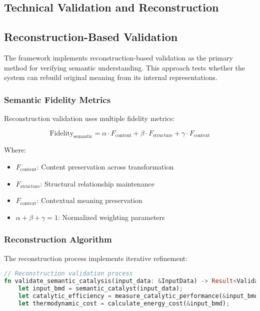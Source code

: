 \documentclass[12pt,a4paper,twoside]{article}
\begin{document}
\begin{itemize}
\section{Technical Validation and Reconstruction}

\subsection{Reconstruction-Based Validation}

The framework implements reconstruction-based validation as the primary method for verifying semantic understanding. This approach tests whether the system can rebuild original meaning from its internal representations.

\subsubsection{Semantic Fidelity Metrics}

Reconstruction validation uses multiple fidelity metrics:

\begin{equation}
\text{Fidelity}_{\text{semantic}} = \alpha \cdot F_{\text{content}} + \beta \cdot F_{\text{structure}} + \gamma \cdot F_{\text{context}}
\end{equation}

Where:
\begin{itemize}
\item $F_{\text{content}}$: Content preservation across transformation
\item $F_{\text{structure}}$: Structural relationship maintenance
\item $F_{\text{context}}$: Contextual meaning preservation
\item $\alpha + \beta + \gamma = 1$: Normalized weighting parameters
\end{itemize}

\subsubsection{Reconstruction Algorithm}

The reconstruction process implements iterative refinement:

\begin{lstlisting}[language=rust,caption=Reconstruction Validation Algorithm]
// Reconstruction validation process
fn validate_semantic_catalysis(input_data: &InputData) -> Result<ValidationResult> {
    let input_bmd = semantic_catalyst(input_data);
    let catalytic_efficiency = measure_catalytic_performance(&input_bmd);
    let thermodynamic_cost = calculate_energy_cost(&input_bmd);


\end{lstlisting}
\end{itemize}
\end{document}
